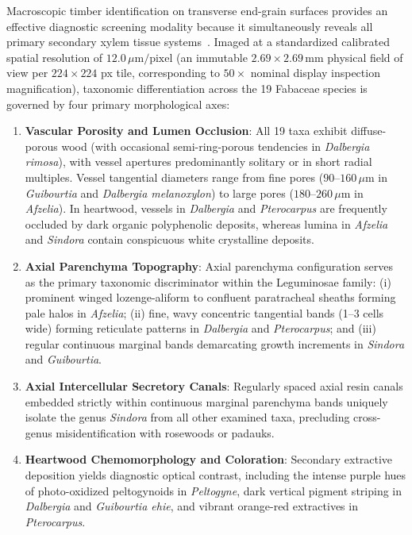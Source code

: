 \documentclass[a4paper,fleqn,12pt]{cas-sc}
\begin{document}
Macroscopic timber identification on transverse end-grain surfaces provides an effective diagnostic screening modality because it simultaneously reveals all primary secondary xylem tissue systems~\cite{wiedenhoeft2011}. Imaged at a standardized calibrated spatial resolution of $12.0\,\mu\text{m/pixel}$ (an immutable $2.69 \times 2.69\,\text{mm}$ physical field of view per $224 \times 224$ px tile, corresponding to $50\times$ nominal display inspection magnification), taxonomic differentiation across the 19 Fabaceae species is governed by four primary morphological axes:
\begin{enumerate}[leftmargin=*,itemsep=2pt,topsep=2pt]
    \item \textbf{Vascular Porosity and Lumen Occlusion}: All 19 taxa exhibit diffuse-porous wood (with occasional semi-ring-porous tendencies in \textit{Dalbergia rimosa}), with vessel apertures predominantly solitary or in short radial multiples. Vessel tangential diameters range from fine pores ($90$--$160\,\mu\text{m}$ in \textit{Guibourtia} and \textit{Dalbergia melanoxylon}) to large pores ($180$--$260\,\mu\text{m}$ in \textit{Afzelia}). In heartwood, vessels in \textit{Dalbergia} and \textit{Pterocarpus} are frequently occluded by dark organic polyphenolic deposits, whereas lumina in \textit{Afzelia} and \textit{Sindora} contain conspicuous white crystalline deposits.
    \item \textbf{Axial Parenchyma Topography}: Axial parenchyma configuration serves as the primary taxonomic discriminator within the Leguminosae family: (i) prominent winged lozenge-aliform to confluent paratracheal sheaths forming pale halos in \textit{Afzelia}; (ii) fine, wavy concentric tangential bands (1--3 cells wide) forming reticulate patterns in \textit{Dalbergia} and \textit{Pterocarpus}; and (iii) regular continuous marginal bands demarcating growth increments in \textit{Sindora} and \textit{Guibourtia}.
    \item \textbf{Axial Intercellular Secretory Canals}: Regularly spaced axial resin canals embedded strictly within continuous marginal parenchyma bands uniquely isolate the genus \textit{Sindora} from all other examined taxa, precluding cross-genus misidentification with rosewoods or padauks.
    \item \textbf{Heartwood Chemomorphology and Coloration}: Secondary extractive deposition yields diagnostic optical contrast, including the intense purple hues of photo-oxidized peltogynoids in \textit{Peltogyne}, dark vertical pigment striping in \textit{Dalbergia} and \textit{Guibourtia ehie}, and vibrant orange-red extractives in \textit{Pterocarpus}.
\end{enumerate}
\end{document}
